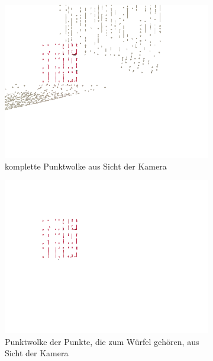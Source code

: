 \documentclass[ngerman,a4paper,parskip=half]{scrartcl}
\begin{document}
\begin{figure}[H]
	\centering
	\begin{subfigure}{0.45\textwidth}
		\includegraphics[width=\textwidth,frame,trim=0 120 0 20,clip]{includes/peak_red_cam.png}
		\caption{komplette Punktwolke aus Sicht der Kamera}
	\end{subfigure}
	\hfill
	\begin{subfigure}{0.45\textwidth}
		\includegraphics[width=\textwidth,frame,trim=0 120 0 20,clip]{includes/peak_only_red_cam.png}
		\caption{Punktwolke der Punkte, die zum Würfel gehören, aus Sicht der Kamera}
	\end{subfigure}
	\begin{subfigure}{0.45\textwidth}

\end{subfigure}
\end{figure}
\end{document}
